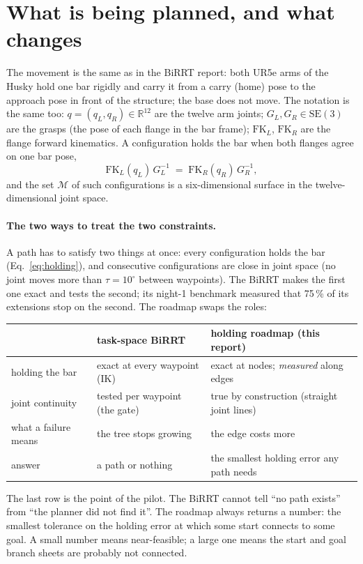 \documentclass[11pt,a4paper]{article}
\newcommand{\code}[1]{\texttt{\detokenize{#1}}}
\newcommand{\R}{\mathbb{R}}
\newcommand{\SE}{\mathrm{SE}(3)}
\begin{document}
\tableofcontents

\section{What is being planned, and what changes}
\label{sec:problem}

The movement is the same as in the BiRRT report: both UR5e arms of the Husky hold
one bar rigidly and carry it from a carry (home) pose to the approach pose in
front of the structure; the base does not move. The notation is the same too:
$q = (q_L, q_R) \in \R^{12}$ are the twelve arm joints; $G_L, G_R \in \SE$ are
the grasps (the pose of each \code{tool0} flange in the bar frame);
$\mathrm{FK}_L$, $\mathrm{FK}_R$ are the flange forward kinematics. A
configuration holds the bar when both flanges agree on one bar pose,
\begin{equation}
  \mathrm{FK}_L(q_L)\, G_L^{-1} \;=\; \mathrm{FK}_R(q_R)\, G_R^{-1},
  \label{eq:holding}
\end{equation}
and the set $\mathcal{M}$ of such configurations is a six-dimensional surface in
the twelve-dimensional joint space.

\paragraph{The two ways to treat the two constraints.}
A path has to satisfy two things at once: every configuration holds the bar
(Eq.~\ref{eq:holding}), and consecutive configurations are close in joint space
(no joint moves more than $\tau = 10^\circ$ between waypoints). The BiRRT makes
the first one exact and tests the second; its night-1 benchmark measured that
75\,\% of its extensions stop on the second. The roadmap swaps the roles:
\begin{center}
\small
\begin{tabular}{@{}lll@{}}
\toprule
 & task-space BiRRT & holding roadmap (this report) \\
\midrule
holding the bar & exact at every waypoint (IK) & exact at nodes; \emph{measured} along edges \\
joint continuity & tested per waypoint (the gate) & true by construction (straight joint lines) \\
what a failure means & the tree stops growing & the edge costs more \\
answer & a path or nothing & the smallest holding error any path needs \\
\bottomrule
\end{tabular}
\end{center}
The last row is the point of the pilot. The BiRRT cannot tell ``no path exists''
from ``the planner did not find it''. The roadmap always returns a number: the
smallest tolerance on the holding error at which some start connects to some
goal. A small number means near-feasible; a large one means the start and goal
branch sheets are probably not connected.
\end{document}
